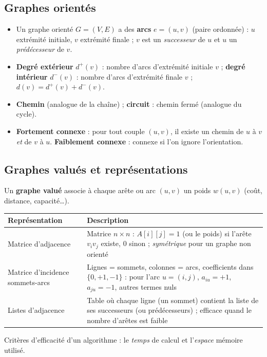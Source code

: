 \documentclass[11pt,a4paper]{article}
\begin{document}
\subsection{Graphes orientés}
\begin{itemize}[nosep]
\item Un graphe orienté $G=(V,E)$ a des \textbf{arcs} $e=(u,v)$ (paire ordonnée) : $u$ extrémité initiale, $v$ extrémité finale ; $v$ est un \emph{successeur} de $u$ et $u$ un \emph{prédécesseur} de $v$.
\item \textbf{Degré extérieur} $d^+(v)$ : nombre d'arcs d'extrémité initiale $v$ ; \textbf{degré intérieur} $d^-(v)$ : nombre d'arcs d'extrémité finale $v$ ; $d(v)=d^+(v)+d^-(v)$.
\item \textbf{Chemin} (analogue de la chaîne) ; \textbf{circuit} : chemin fermé (analogue du cycle).
\item \textbf{Fortement connexe} : pour tout couple $(u,v)$, il existe un chemin de $u$ à $v$ \emph{et} de $v$ à $u$. \textbf{Faiblement connexe} : connexe si l'on ignore l'orientation.
\end{itemize}

\subsection{Graphes valués et représentations}
Un \textbf{graphe valué} associe à chaque arête ou arc $(u,v)$ un poids $w(u,v)$ (coût, distance, capacité\dots).

\begin{center}
\small
\begin{tabular}{@{}p{3.6cm}p{12.4cm}@{}}
\toprule
\textbf{Représentation} & \textbf{Description}\\
\midrule
Matrice d'adjacence & Matrice $n\times n$ : $A[i][j]=1$ (ou le poids) si l'arête $v_iv_j$ existe, $0$ sinon ; \emph{symétrique} pour un graphe non orienté\\
Matrice d'incidence sommets-arcs & Lignes = sommets, colonnes = arcs, coefficients dans $\{0,+1,-1\}$ : pour l'arc $u=(i,j)$, $a_{iu}=+1$, $a_{ju}=-1$, autres termes nuls\\
Listes d'adjacence & Table où chaque ligne (un sommet) contient la liste de ses successeurs (ou prédécesseurs) ; efficace quand le nombre d'arêtes est faible\\
\bottomrule
\end{tabular}
\end{center}
Critères d'efficacité d'un algorithme : le \emph{temps} de calcul et l'\emph{espace} mémoire utilisé.
\end{document}
